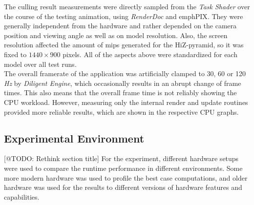 \noindent
The culling result measurements were directly sampled from the \emph{Task Shader} over the course of the testing 
animation, using \emph{RenderDoc} and emph{PIX}. They were generally independent from the hardware and rather 
depended on the camera position and viewing angle as well as on model resolution. Also, the screen resolution 
affected the amount of mips generated for the \ac{HiZ}-pyramid, so it was fixed to $1440 \times 900$ pixels. 
All of the aspects above were standardized for each model over all test runs.\\

\noindent 
The overall framerate of the application was artificially clamped to 30, 60 or 120 \emph{Hz} by \emph{Diligent Engine}, 
which occasionally results in an abrupt change of frame times. This also means that the overall frame time is not 
reliably showing the \ac{CPU} workload. However, measuring only the internal render and update routines provided 
more reliable results, which are shown in the respective \ac{CPU} graphs. 


\subsection*{Experimental Environment} \label{subsec-experimental-environment}

[@TODO: Rethink section title]
For the experiment, different hardware setups were used to compare the runtime performance in different environments.
Some more modern hardware was used to profile the best case computations, and older hardware was used for the results 
to different versions of hardware features and capabilities.

